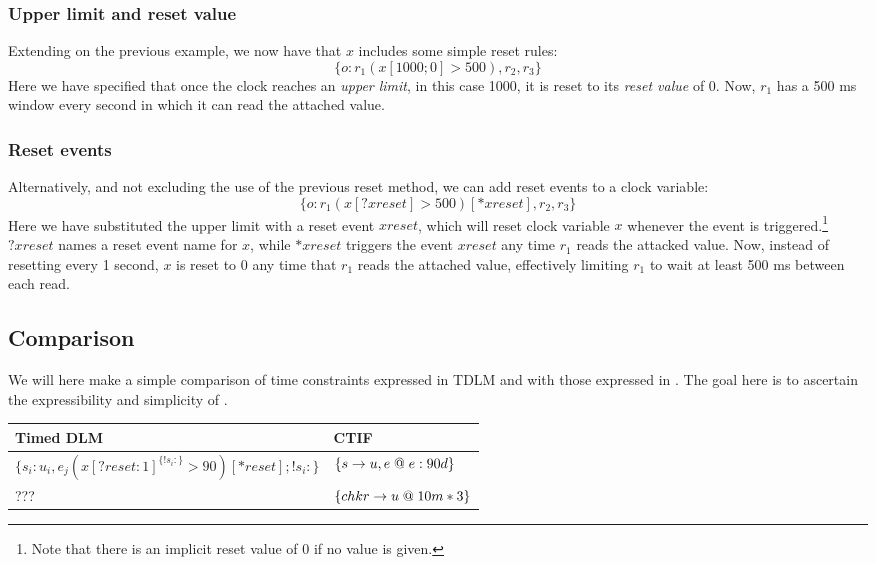 \subsubsection{Upper limit and reset value}
Extending on the previous example, we now have that $x$ includes some simple reset rules:
  \[ \{ o : r_1(x[1000;0] > 500), r_2, r_3 \} \]
Here we have specified that once the clock reaches an \emph{upper limit}, in this case 1000, it is reset to its \emph{reset value} of 0.
Now, $r_1$ has a 500 ms window every second in which it can read the attached value.

\subsubsection{Reset events}
Alternatively, and not excluding the use of the previous reset method, we can add reset events to a clock variable:
  \[ \{ o : r_1(x[?xreset] > 500)[*xreset], r_2, r_3 \} \]
Here we have substituted the upper limit with a reset event $xreset$, which will reset clock variable $x$ whenever the event is triggered.\footnote{Note that there is an implicit reset value of 0 if no value is given.}
$?xreset$ names a reset event name for $x$, while $*xreset$ triggers the event $xreset$ any time $r_1$ reads the attacked value.
Now, instead of resetting every 1 second, $x$ is reset to 0 any time that $r_1$ reads the attached value, effectively limiting $r_1$ to wait at least 500 ms between each read.

\subsection{Comparison}
We will here make a simple comparison of time constraints expressed in TDLM and with those expressed in \thelang.
The goal here is to ascertain the expressibility and simplicity of \thelang.

\begin{tabular}{|l|l|}
  \hline
  Timed DLM & CTIF \\ \hline
  $\{s_i : u_i, e_j (x[?reset : 1]^{\{ !s_i: \}} > 90)[*reset]; !s_i: \}$ & $\{s \rightarrow u, e \;@\; e: 90d \}$ \\ \hline
  ??? & $\{ chkr \rightarrow u \;@\; 10m * 3 \}$ \\ \hline

\end{tabular}
